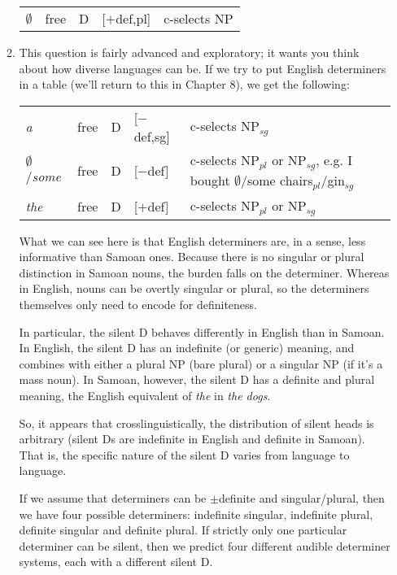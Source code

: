 \documentclass[a4paper,12pt]{article}
\begin{document}
\begin{enumerate}
\begin{enumerate}[label=(\roman*)]
             \begin{tabular}{l|l|l|l|l}
               $\emptyset$ & free & D & [$+$def,pl] & c-selects NP
             \end{tabular}

         \item This question is fairly advanced and exploratory; it wants you think about how diverse languages can be. If we try to put English determiners in a table (we'll return to this in Chapter 8), we get the following:

             \begin{tabular}{l|l|l|l|l}
               \textit{a} & free & D & [$-$def,sg] & c-selects NP$_{sg}$ \\
               $\emptyset$/\textit{some} & free & D & [$-$def] & c-selects NP$_{pl}$ or NP$_{sg}$, e.g. I bought $\emptyset$/some chairs$_{pl}$/gin$_{sg}$ \\
               \textit{the} & free & D & [$+$def] & c-selects NP$_{pl}$ or NP$_{sg}$
             \end{tabular}

            What we can see here is that English determiners are, in a sense, less informative than Samoan ones. Because there is no singular or plural distinction in Samoan nouns, the burden falls on the determiner. Whereas in English, nouns can be overtly singular or plural, so the determiners themselves only need to encode for definiteness.

            In particular, the silent D behaves differently in English than in Samoan. In English, the silent D has an indefinite (or generic) meaning, and combines with either a plural NP (bare plural) or a singular NP (if it's a mass noun). In Samoan, however, the silent D has a definite and plural meaning, the English equivalent of \textit{the} in \textit{the dogs}.

            So, it appears that crosslinguistically, the distribution of silent heads is arbitrary (silent Ds are indefinite in English and definite in Samoan). That is, the specific nature of the silent D varies from language to language.

            If we assume that determiners can be $\pm$definite and singular/plural, then we have four possible determiners: indefinite singular, indefinite plural, definite singular and definite plural. If strictly only one particular determiner can be silent, then we predict four different audible determiner systems, each with a different silent D.


\end{enumerate}
\end{enumerate}
\end{document}
